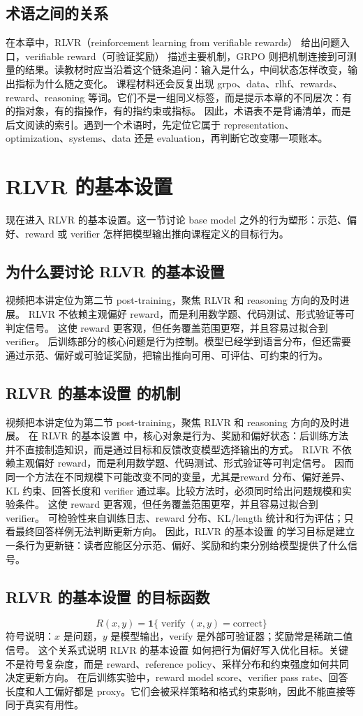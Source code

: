 \documentclass[a4paper]{article}
\begin{document}
\subsection{术语之间的关系}
在本章中，RLVR（reinforcement learning from verifiable rewards） 给出问题入口，verifiable reward（可验证奖励） 描述主要机制，GRPO 则把机制连接到可测量的结果。读教材时应当沿着这个链条追问：输入是什么，中间状态怎样改变，输出指标为什么随之变化。
课程材料还会反复出现 grpo、data、rlhf、rewards、reward、reasoning 等词。它们不是一组同义标签，而是提示本章的不同层次：有的指对象，有的指操作，有的指约束或指标。
因此，术语表不是背诵清单，而是后文阅读的索引。遇到一个术语时，先定位它属于 representation、optimization、systems、data 还是 evaluation，再判断它改变哪一项账本。
\section{RLVR 的基本设置}
现在进入 RLVR 的基本设置。这一节讨论 base model 之外的行为塑形：示范、偏好、reward 或 verifier 怎样把模型输出推向课程定义的目标行为。
\subsection{为什么要讨论 RLVR 的基本设置}
视频把本讲定位为第二节 post-training，聚焦 RLVR 和 reasoning 方向的及时进展。
RLVR 不依赖主观偏好 reward，而是利用数学题、代码测试、形式验证等可判定信号。
这使 reward 更客观，但任务覆盖范围更窄，并且容易过拟合到 verifier。
后训练部分的核心问题是行为控制。模型已经学到语言分布，但还需要通过示范、偏好或可验证奖励，把输出推向可用、可评估、可约束的行为。
\subsection{RLVR 的基本设置 的机制}
视频把本讲定位为第二节 post-training，聚焦 RLVR 和 reasoning 方向的及时进展。 在 RLVR 的基本设置 中，核心对象是行为、奖励和偏好状态：后训练方法并不直接制造知识，而是通过目标和反馈改变模型选择输出的方式。
RLVR 不依赖主观偏好 reward，而是利用数学题、代码测试、形式验证等可判定信号。 因而同一个方法在不同规模下可能改变不同的变量，尤其是reward 分布、偏好差异、KL 约束、回答长度和 verifier 通过率。比较方法时，必须同时给出问题规模和实验条件。
这使 reward 更客观，但任务覆盖范围更窄，并且容易过拟合到 verifier。 可检验性来自训练日志、reward 分布、KL/length 统计和行为评估；只看最终回答样例无法判断更新方向。
因此，RLVR 的基本设置 的学习目标是建立一条行为更新链：读者应能区分示范、偏好、奖励和约束分别给模型提供了什么信号。
\subsection{RLVR 的基本设置 的目标函数}
\[R(x,y)=\mathbf{1}\{\operatorname{verify}(x,y)=\text{correct}\}\]
符号说明：\(x\) 是问题，\(y\) 是模型输出，verify 是外部可验证器；奖励常是稀疏二值信号。
这个关系式说明 RLVR 的基本设置 如何把行为偏好写入优化目标。关键不是符号复杂度，而是 reward、reference policy、采样分布和约束强度如何共同决定更新方向。
在后训练实验中，reward model score、verifier pass rate、回答长度和人工偏好都是 proxy。它们会被采样策略和格式约束影响，因此不能直接等同于真实有用性。
\end{document}
